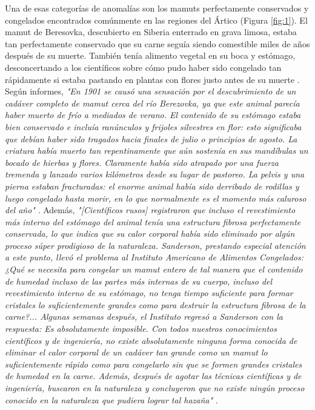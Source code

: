 \documentclass[10pt,twocolumn,letterpaper]{article}
\begin{document}
Una de esas categorías de anomalías son los mamuts perfectamente conservados y congelados encontrados comúnmente en las regiones del Ártico (Figura \ref{fig:1}). El mamut de Beresovka, descubierto en Siberia enterrado en grava limosa, estaba tan perfectamente conservado que su carne seguía siendo comestible miles de años después de su muerte. También tenía alimento vegetal en su boca y estómago, desconcertando a los científicos sobre cómo pudo haber sido congelado tan rápidamente si estaba pastando en plantas con flores justo antes de su muerte \cite{17}. Según informes, \textit{"En 1901 se causó una sensación por el descubrimiento de un cadáver completo de mamut cerca del río Berezovka, ya que este animal parecía haber muerto de frío a mediados de verano. El contenido de su estómago estaba bien conservado e incluía ranúnculos y frijoles silvestres en flor: esto significaba que debían haber sido tragados hacia finales de julio o principios de agosto. La criatura había muerto tan repentinamente que aún sostenía en sus mandíbulas un bocado de hierbas y flores. Claramente había sido atrapado por una fuerza tremenda y lanzado varios kilómetros desde su lugar de pastoreo. La pelvis y una pierna estaban fracturadas: el enorme animal había sido derribado de rodillas y luego congelado hasta morir, en lo que normalmente es el momento más caluroso del año"} \cite{18}. Además, \textit{"[Científicos rusos] registraron que incluso el revestimiento más interno del estómago del animal tenía una estructura fibrosa perfectamente conservada, lo que indica que su calor corporal había sido eliminado por algún proceso súper prodigioso de la naturaleza. Sanderson, prestando especial atención a este punto, llevó el problema al Instituto Americano de Alimentos Congelados: ¿Qué se necesita para congelar un mamut entero de tal manera que el contenido de humedad incluso de las partes más internas de su cuerpo, incluso del revestimiento interno de su estómago, no tenga tiempo suficiente para formar cristales lo suficientemente grandes como para destruir la estructura fibrosa de la carne?... Algunas semanas después, el Instituto regresó a Sanderson con la respuesta: Es absolutamente imposible. Con todos nuestros conocimientos científicos y de ingeniería, no existe absolutamente ninguna forma conocida de eliminar el calor corporal de un cadáver tan grande como un mamut lo suficientemente rápido como para congelarlo sin que se formen grandes cristales de humedad en la carne. Además, después de agotar las técnicas científicas y de ingeniería, buscaron en la naturaleza y concluyeron que no existe ningún proceso conocido en la naturaleza que pudiera lograr tal hazaña"} \cite{19}.
\end{document}
